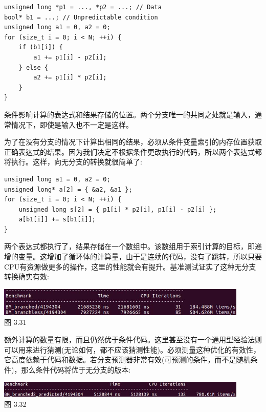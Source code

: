 \begin{lstlisting}[style=styleCXX]
unsigned long *p1 = ..., *p2 = ...; // Data
bool* b1 = ...; // Unpredictable condition
unsigned long a1 = 0, a2 = 0;
for (size_t i = 0; i < N; ++i) {
	if (b1[i]) {
		a1 += p1[i] - p2[i];
	} else {
		a2 += p1[i] * p2[i];
	}
}
\end{lstlisting}

条件影响计算的表达式和结果存储的位置。两个分支唯一的共同之处就是输入，通常情况下，即使是输入也不一定是这样。

为了在没有分支的情况下计算出相同的结果，必须从条件变量索引的内存位置获取正确表达式的结果。因为我们决定不根据条件更改执行的代码，所以两个表达式都将执行。这样，向无分支的转换就很简单了:

\begin{lstlisting}[style=styleCXX]
unsigned long a1 = 0, a2 = 0;
unsigned long* a[2] = { &a2, &a1 };
for (size_t i = 0; i < N; ++i) {
	unsigned long s[2] = { p1[i] * p2[i], p1[i] - p2[i] };
	a[b1[i]] += s[b1[i]];
}
\end{lstlisting}

两个表达式都执行了，结果存储在一个数组中。该数组用于索引计算的目标，即递增的变量。这增加了循环体的计算量，由于是连续的代码，没有了跳转，所以只要CPU有资源做更多的操作，这里的性能就会有提升。基准测试证实了这种无分支转换确实有效:

\begin{center}
\includegraphics[width=0.9\textwidth]{content/1/chapter3/images/31.jpg}\\
图 3.31
\end{center}

额外计算的数量有限，而且仍然优于条件代码。这里甚至没有一个通用型经验法则可以用来进行猜测(无论如何，都不应该猜测性能)。必须测量这种优化的有效性，它高度依赖于代码和数据。若分支预测器非常有效(可预测的条件，而不是随机条件)，那么条件代码将优于无分支的版本:

\begin{center}
\includegraphics[width=0.9\textwidth]{content/1/chapter3/images/32.jpg}\\
图 3.32
\end{center}

